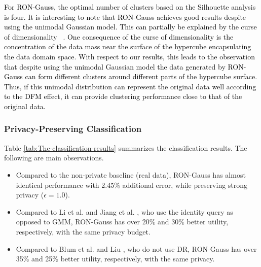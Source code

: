 \documentclass[USenglish,oneside,twocolumn]{article}
\theoremstyle{definition}
\theoremstyle{remark}
\theoremstyle{plain}
\theoremstyle{plain}
\newcommand{\chang}{\textcolor{black}}
\begin{document}
\chang{For RON-Gauss, the optimal number of clusters based on the Silhouette analysis is four. It is  interesting to note that RON-Gauss achieves good results despite using the unimodal Gaussian model. This can partially be explained by the curse of dimensionality
~\cite{RefWorks:350,beyer1999nearest,koppen2000curse,donoho2000high}. One consequence of the curse of dimensionality is the concentration of the data mass near the surface of the hypercube encapsulating the data domain space. With respect to our results, this leads to the observation that despite using the unimodal Gaussian model the data generated by RON-Gauss can form different clusters around different parts of the hypercube surface. 
Thus, if this unimodal distribution can represent the original data well according to the DFM effect, it can provide clustering performance close to that of the original data. 
}

\vspace{-2em}
\subsubsection{Privacy-Preserving Classification}
\vspace{-1em}
Table \ref{tab:The-classification-results} summarizes the classification
results. The following are main observations. 
\begin{itemize}
\item Compared to the non-private baseline (real data), RON-Gauss has almost
identical performance with 2.45\% additional error, while preserving
strong privacy ($\epsilon=1.0$). 
\item Compared to Li et al. \cite{RefWorks:337} and Jiang et al. \cite{RefWorks:339},
who use the identity query as opposed to GMM, RON-Gauss has over 20\%
and 30\% better utility, respectively, with the same privacy budget. 
\item Compared to Blum et al. \cite{RefWorks:174} and Liu \cite{RefWorks:372},
who do not use DR, RON-Gauss has over 35\% and 25\% better utility,
respectively, with the same privacy. 
\end{itemize}
\vspace{-2em}
\end{document}
